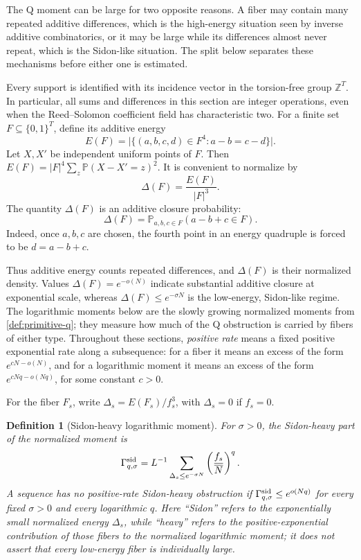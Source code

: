 \documentclass[12pt,a4paper]{amsart}
\numberwithin{equation}{section}
\newtheorem{definition}[definition]{Definition}
\theoremstyle{remark}
\newcommand{\Z}{\mathbb Z}
\newcommand{\Prob}{\mathbb P}
\newcommand{\Gsid}{\Gamma^{\rm sid}}
\newcommand{\barN}{\overline N}
\newcommand{\abs}[1]{\lvert #1\rvert}
\begin{document}
The Q moment can be large for two opposite reasons.  A fiber may contain
many repeated additive differences, which is the high-energy situation
seen by inverse additive combinatorics, or it may be large while its
differences almost never repeat, which is the Sidon-like situation.  The
split below separates these mechanisms before either one is estimated.

Every support is identified with its incidence vector in the torsion-free
group \(\Z^T\).  In particular, all sums and differences in this section
are integer operations, even when the Reed--Solomon coefficient field has
characteristic two.  For a finite set \(F\subseteq\{0,1\}^T\), define its
additive energy
\[
        E(F)=\abs{\{(a,b,c,d)\in F^4:a-b=c-d\}}.
\]
Let \(X,X'\) be independent uniform points of \(F\).  Then \(E(F)=\abs F^4\sum_z\Prob(X-X'=z)^2\).  It is convenient to normalize by
\[
        \Delta(F)=\frac{E(F)}{\abs F^3}.
\]
The quantity \(\Delta(F)\) is an additive closure probability:
\[
        \Delta(F)=\Prob_{a,b,c\in F}(a-b+c\in F).
\]
Indeed, once \(a,b,c\) are chosen, the fourth point in an energy quadruple is forced to be \(d=a-b+c\).

Thus additive energy counts repeated differences, and \(\Delta(F)\) is
their normalized density.  Values \(\Delta(F)=e^{-o(N)}\) indicate
substantial additive closure at exponential scale, whereas
\(\Delta(F)\le e^{-\sigma N}\) is the low-energy, Sidon-like regime.
The logarithmic moments below are the slowly growing normalized moments
from \cref{def:primitive-q}; they measure how much of the Q obstruction is
carried by fibers of either type.
Throughout these sections, \emph{positive rate} means a fixed positive
exponential rate along a subsequence: for a fiber it means an excess of
the form \(e^{cN-o(N)}\), and for a logarithmic moment it means an excess
of the form \(e^{cNq-o(Nq)}\), for some constant \(c>0\).

For the fiber \(F_s\), write \(\Delta_s=E(F_s)/f_s^3\), with \(\Delta_s=0\) if \(f_s=0\).

\begin{definition}[Sidon-heavy logarithmic moment]\label{def:sidon-heavy}
For \(\sigma>0\), the Sidon-heavy part of the normalized moment is
\[
        \Gsid_{q,\sigma}=L^{-1}\sum_{\Delta_s\le e^{-\sigma N}}
        \left(\frac{f_s}{\barN}\right)^q.
\]
A sequence has no positive-rate Sidon-heavy obstruction if \(\Gsid_{q,\sigma}\le e^{o(Nq)}\) for every fixed \(\sigma>0\) and every logarithmic \(q\).
Here ``Sidon'' refers to the exponentially small normalized energy
\(\Delta_s\), while ``heavy'' refers to the positive-exponential
contribution of those fibers to the normalized logarithmic moment; it does
not assert that every low-energy fiber is individually large.
\end{definition}
\end{document}

